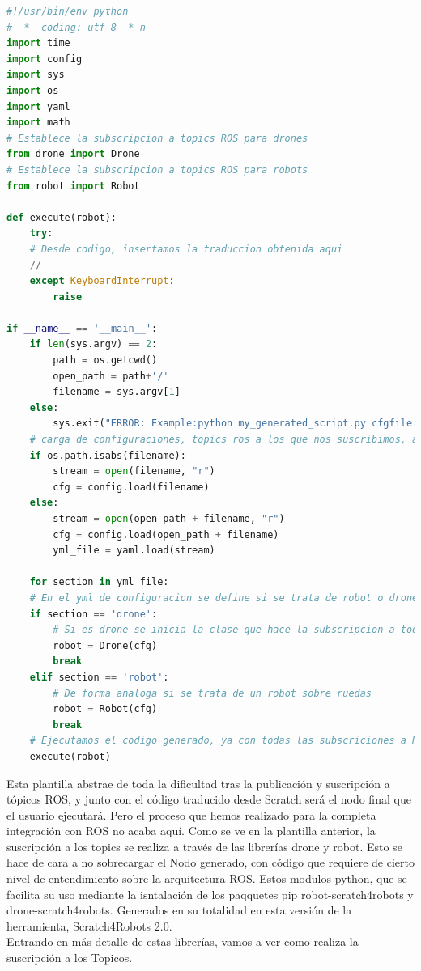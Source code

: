 \begin{lstlisting}[language=python,firstnumber=1]
#!/usr/bin/env python
# -*- coding: utf-8 -*-n
import time
import config
import sys
import os
import yaml
import math
# Establece la subscripcion a topics ROS para drones
from drone import Drone 
# Establece la subscripcion a topics ROS para robots
from robot import Robot 

def execute(robot):
    try:
    # Desde codigo, insertamos la traduccion obtenida aqui 
    //
    except KeyboardInterrupt:
        raise
        
if __name__ == '__main__':
    if len(sys.argv) == 2:
        path = os.getcwd()
        open_path = path+'/'
        filename = sys.argv[1]
    else:
        sys.exit("ERROR: Example:python my_generated_script.py cfgfile.yml")
    # carga de configuraciones, topics ros a los que nos suscribimos, a traves de fichero yml.
    if os.path.isabs(filename):
        stream = open(filename, "r")
        cfg = config.load(filename)
    else:
        stream = open(open_path + filename, "r")
        cfg = config.load(open_path + filename)
        yml_file = yaml.load(stream)
        
    for section in yml_file:
    # En el yml de configuracion se define si se trata de robot o drone.
    if section == 'drone':
        # Si es drone se inicia la clase que hace la subscripcion a todos los topics ROS
        robot = Drone(cfg)
    	break
    elif section == 'robot':
    	# De forma analoga si se trata de un robot sobre ruedas
        robot = Robot(cfg)
    	break
    # Ejecutamos el codigo generado, ya con todas las subscriciones a ROS hechas
    execute(robot)

\end{lstlisting}


Esta plantilla abstrae de toda la dificultad tras la publicación y suscripción a tópicos ROS, y junto con el código traducido desde Scratch será el nodo final que el usuario ejecutará. Pero el proceso que hemos realizado para la completa integración con ROS no acaba aquí. Como se ve en la plantilla anterior, la suscripción a los topics se realiza a través de las librerías drone y robot. Esto se hace de cara a no sobrecargar el Nodo generado, con código que requiere de cierto nivel de entendimiento sobre la arquitectura ROS. Estos modulos python, que se facilita su uso mediante la isntalación de los paqquetes pip robot-scratch4robots y drone-scratch4robots. Generados en su totalidad en esta versión de la herramienta, Scratch4Robots 2.0.\\

Entrando en más detalle de estas librerías, vamos a ver como realiza la suscripción a los Topicos.

